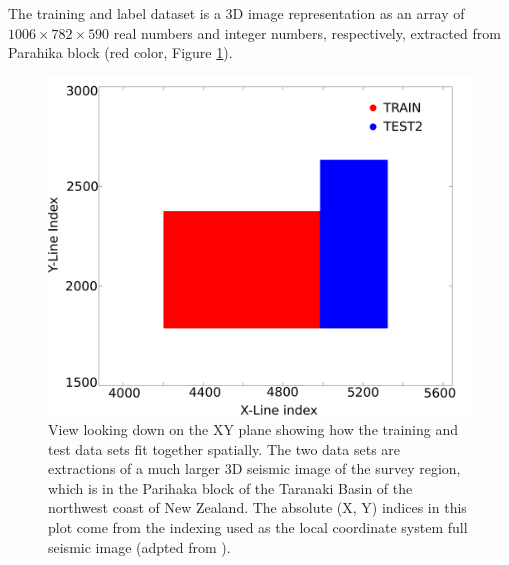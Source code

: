 \documentclass[twoside,letterpaper,twocolumn]{article}
\begin{document}
The training and label dataset is a 3D image representation as an array of $1006 \times 782 \times 590$ real numbers and integer numbers, respectively, extracted from Parahika block (red color, Figure \ref{fig:parahika_bloco}). 
\begin{figure}[h!]
	\centering
	\includegraphics[width=\columnwidth]{Figures/parahika_block.pdf}
	\caption{View looking down on the XY plane showing how the training and test data sets fit together spatially. The two data sets are extractions of a much larger 3D seismic image of the survey region, which is in the Parihaka block of the Taranaki Basin of the northwest coast of New Zealand. The absolute (X, Y) indices in this plot come from the indexing used as the local coordinate system full seismic image (adpted from \citet{seismicchalenge(2020)}).}
	\label{fig:parahika_bloco}
\end{figure}
\end{document}
